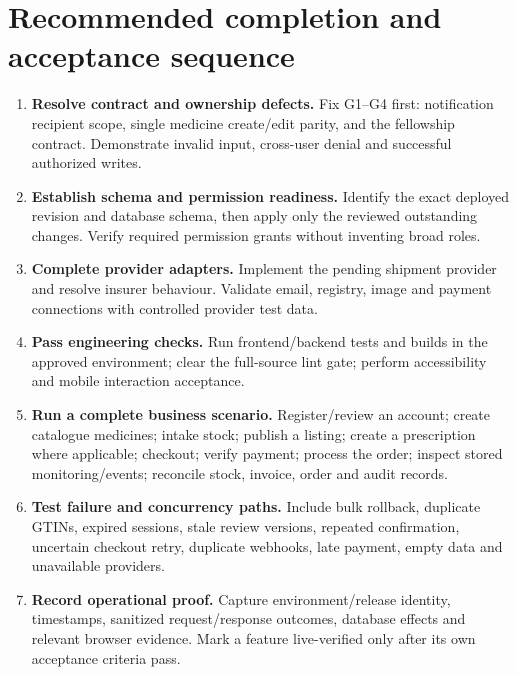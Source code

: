\documentclass[11pt,a4paper]{article}
\begin{document}
\section{Recommended completion and acceptance sequence}
\begin{enumerate}
\item \textbf{Resolve contract and ownership defects.} Fix G1--G4 first: notification recipient scope, single medicine create/edit parity, and the fellowship contract. Demonstrate invalid input, cross-user denial and successful authorized writes.
\item \textbf{Establish schema and permission readiness.} Identify the exact deployed revision and database schema, then apply only the reviewed outstanding changes. Verify required permission grants without inventing broad roles.
\item \textbf{Complete provider adapters.} Implement the pending shipment provider and resolve insurer behaviour. Validate email, registry, image and payment connections with controlled provider test data.
\item \textbf{Pass engineering checks.} Run frontend/backend tests and builds in the approved environment; clear the full-source lint gate; perform accessibility and mobile interaction acceptance.
\item \textbf{Run a complete business scenario.} Register/review an account; create catalogue medicines; intake stock; publish a listing; create a prescription where applicable; checkout; verify payment; process the order; inspect stored monitoring/events; reconcile stock, invoice, order and audit records.
\item \textbf{Test failure and concurrency paths.} Include bulk rollback, duplicate GTINs, expired sessions, stale review versions, repeated confirmation, uncertain checkout retry, duplicate webhooks, late payment, empty data and unavailable providers.
\item \textbf{Record operational proof.} Capture environment/release identity, timestamps, sanitized request/response outcomes, database effects and relevant browser evidence. Mark a feature live-verified only after its own acceptance criteria pass.
\end{enumerate}
\end{document}
